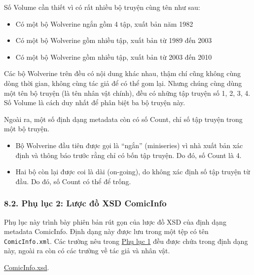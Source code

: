 \documentclass[
]{article}
\begin{document}
Số Volume cần thiết vì có rất nhiều bộ truyện cùng tên như sau:

\begin{itemize}
\item
  Có một bộ Wolverine ngắn gồm 4 tập, xuất bản năm 1982
\item
  Có một bộ Wolverine gồm nhiều tập, xuất bản từ 1989 đến 2003
\item
  Có một bộ Wolverine gồm nhiều tập, xuất bản từ 2003 đến 2010
\end{itemize}

Các bộ Wolverine trên đều có nội dung khác nhau, thậm chí cũng không
cùng dòng thời gian, không cùng tác giả để có thể gom lại. Nhưng chúng
cùng dùng một tên bộ truyện (là tên nhân vật chính), đều có những tập
truyện số 1, 2, 3, 4. Số Volume là cách duy nhất để phân biệt ba bộ
truyện này.

Ngoài ra, một số định dạng metadata còn có số Count, chỉ số tập truyện
trong một bộ truyện.

\begin{itemize}
\item
  Bộ Wolverine đầu tiên được gọi là ``ngắn'' (miniseries) vì nhà xuất
  bản xác định và thông báo trước rằng chỉ có bốn tập truyện. Do đó, số
  Count là 4.
\item
  Hai bộ còn lại được coi là dài (on-going), do không xác định số tập
  truyện từ đầu. Do đó, số Count có thể để trống.
\end{itemize}

\hypertarget{phux1ee5-lux1ee5c-2-lux1b0ux1ee3c-ux111ux1ed3-xsd-comicinfo}{%
\subsubsection{\texorpdfstring{8.2. Phụ lục 2: Lược đồ XSD ComicInfo
}{8.2. Phụ lục 2: Lược đồ XSD ComicInfo }}\label{phux1ee5-lux1ee5c-2-lux1b0ux1ee3c-ux111ux1ed3-xsd-comicinfo}}

Phụ lục này trình bày phiên bản rút gọn của lược đồ XSD của định dạng
metadata ComicInfo. Định dạng này được lưu trong một tệp có tên
\texttt{ComicInfo.xml}. Các trường nêu trong
\protect\hyperlink{P9.1-metadata}{Phụ lục 1} đều được chứa trong định
dạng này, ngoài ra còn có các trường về tác giả và nhân vật.

\href{../assets/ComicInfo.xsd}{ComicInfo.xsd}.
\end{document}
